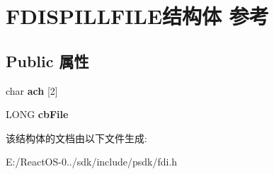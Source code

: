 \hypertarget{struct_f_d_i_s_p_i_l_l_f_i_l_e}{}\section{F\+D\+I\+S\+P\+I\+L\+L\+F\+I\+L\+E结构体 参考}
\label{struct_f_d_i_s_p_i_l_l_f_i_l_e}
\subsection*{Public 属性}
\begin{DoxyCompactItemize}
\item 
\mbox{\label{struct_f_d_i_s_p_i_l_l_f_i_l_e_aa01c03c71d2b57f91faec72fb7c407a7}} 
char {\bfseries ach} \mbox{[}2\mbox{]}
\item 
\mbox{\label{struct_f_d_i_s_p_i_l_l_f_i_l_e_a1fccad02eea0e3913001859e43220292}} 
L\+O\+NG {\bfseries cb\+File}
\end{DoxyCompactItemize}


该结构体的文档由以下文件生成\+:\begin{DoxyCompactItemize}
\item 
E\+:/\+React\+O\+S-\/0../sdk/include/psdk/fdi.\+h\end{DoxyCompactItemize}
